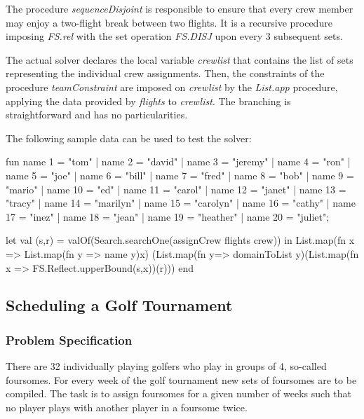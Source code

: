 \documentclass[a4paper,halfparskip]{scrartcl}
\begin{document}
The procedure \emph{sequenceDisjoint} is responsible to ensure that every 
crew member may enjoy a two-flight break between two flights. It 
is a recursive procedure imposing \emph{FS.rel} with the set operation
\emph{FS.DISJ} upon every 3 subsequent sets.

The actual solver declares the local variable \emph{crewlist} that 
contains the list of sets representing the individual crew 
assignments. Then, the constraints of the procedure \emph{teamConstraint} 
are imposed on \emph{crewlist} by the \emph{List.app} procedure, 
applying the data provided by \emph{flights} to \emph{crewlist}. 
The branching is straightforward and has no particularities.

The following sample data can be used to test the solver:
\begin{myverbatim}
fun name 1 = "tom"
  | name 2 = "david"
  | name 3 = "jeremy"
  | name 4 = "ron"
  | name 5 = "joe"
  | name 6 = "bill"
  | name 7 = "fred"
  | name 8 = "bob"
  | name 9 = "mario"
  | name 10 = "ed"
  | name 11 = "carol"
  | name 12 = "janet"
  | name 13 = "tracy"
  | name 14 = "marilyn"
  | name 15 = "carolyn"
  | name 16 = "cathy"
  | name 17 = "inez"
  | name 18 = "jean"
  | name 19 = "heather"
  | name 20 = "juliet";

let 
    val (s,r) = valOf(Search.searchOne(assignCrew flights crew))
in  
    List.map(fn x => List.map(fn y => name y)x)
      (List.map(fn y=> domainToList y)(List.map(fn x => 
                            FS.Reflect.upperBound(s,x))(r)))
end
\end{myverbatim}



\newpage
\subsection{Scheduling a Golf Tournament}

\subsubsection{Problem Specification}
There are 32 individually playing golfers who play in 
groups of 4, so-called foursomes. For every week of the 
golf tournament new sets of foursomes are to be compiled. 
The task is to assign foursomes for a given number of weeks 
such that no player plays with another player in a foursome twice. 
\end{document}
